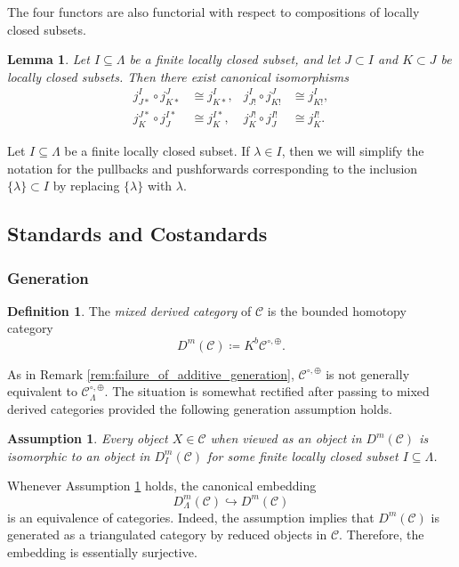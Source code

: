\documentclass{amsart}
\newcommand{\scrC}{\mathcal{C}}
\newtheorem{lemma}[subsubsection]{Lemma}
\newtheorem{assumption}[subsubsection]{Assumption}
\theoremstyle{definition}
\newtheorem{definition}[subsubsection]{Definition}
\numberwithin{equation}{subsection}
\begin{document}
The four functors are also functorial with respect to compositions of locally closed subsets.
\begin{lemma}
    Let $I \subseteq \Lambda$ be a finite locally closed subset, and let $J \subset I$ and $K \subset J$ be locally closed subsets.
    Then there exist canonical isomorphisms
    \begin{align*}
        j_{J*}^I \circ j_{K*}^J &\cong j_{K*}^I, & j_{J!}^I \circ j_{K!}^J &\cong j_{K!}^I, \\
        j_{K}^{J*} \circ j_J^{I*} &\cong j_K^{I*}, & j_{K}^{J!} \circ j_J^{I!} &\cong j_K^{I!}.
    \end{align*}
\end{lemma}

Let $I \subseteq \Lambda$ be a finite locally closed subset.
If $\lambda \in I$, then we will simplify the notation for the pullbacks and pushforwards corresponding to the inclusion $\{ \lambda \} \subset I$ by replacing $\{ \lambda \}$ with $\lambda$.

\subsection{Standards and Costandards}\label{subsub:stds_and_costds}

\subsubsection{Generation}

\begin{definition}
    The \emph{mixed derived category} of $\scrC$ is the bounded homotopy category
\[D^m (\scrC) \coloneq K^b \scrC^{\circ, \oplus}.\]
\end{definition}

As in Remark \ref{rem:failure_of_additive_generation}, $\scrC^{\circ, \oplus}$ is not generally equivalent to $\scrC_{\Lambda}^{\circ, \oplus}$.
The situation is somewhat rectified after passing to mixed derived categories provided the following generation assumption holds.

\begin{assumption}\label{ass:generation_assumption}
    Every object $X \in \scrC$ when viewed as an object in $D^m (\scrC)$ is isomorphic to an object in $D_I^m (\scrC)$ for some finite locally closed subset $I \subseteq \Lambda$.
\end{assumption}

Whenever Assumption \ref{ass:generation_assumption} holds, the canonical embedding
\[D_{\Lambda}^m (\scrC) \hookrightarrow D^m (\scrC)\]
is an equivalence of categories. Indeed, the assumption implies that $D^m (\scrC)$ is generated as a triangulated category by reduced objects in $\scrC$. Therefore, the embedding is essentially surjective.
\end{document}

